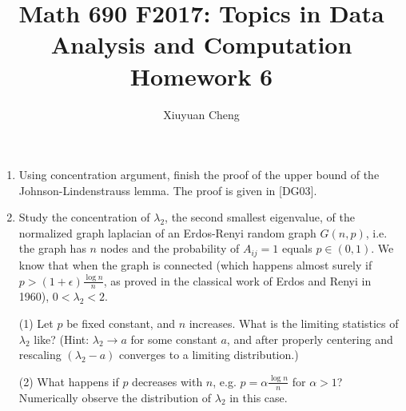 \documentclass[english]{article}
\begin{document}
\title{Math 690 F2017: Topics in Data Analysis and Computation\\
Homework 6}

\author{Xiuyuan Cheng}
\date{}

\maketitle

\begin{enumerate}

\item

Using concentration argument, finish the proof of the upper bound of the Johnson-Lindenstrauss lemma.
The proof is given in [DG03].

\item

Study the concentration of $\lambda_2$, the second smallest eigenvalue, of the normalized graph laplacian of an Erdos-Renyi random graph $G(n,p)$, i.e. the graph has $n$ nodes and the probability of $A_{ij}=1$ equals $p \in (0,1)$. We know that when the graph is connected (which happens almost surely if $p > (1+\epsilon)\frac{ \log n }{n}$, as proved in the classical work of Erdos and Renyi in 1960), $0< \lambda_2 < 2$.

(1) Let $p$ be fixed constant, and $n$ increases. What is the limiting statistics of $\lambda_2$ like? (Hint: $\lambda_2 \to a$ for some constant $a$, and after properly centering and rescaling $(\lambda_2 - a)$ converges to a limiting distribution.)

(2) What happens if $p$ decreases with $n$, e.g. $p = \alpha \frac{\log n }{n }$ for $\alpha > 1$? Numerically observe the distribution of $\lambda_2$ in this case.

\end{enumerate}
\end{document}
